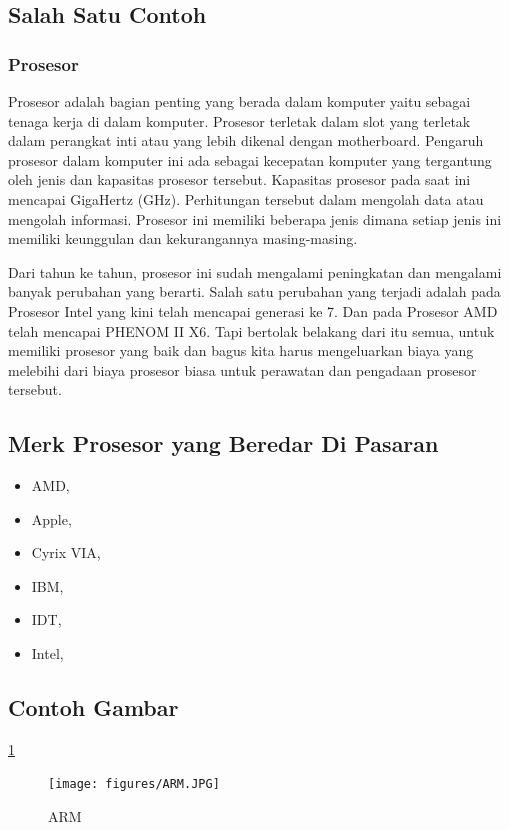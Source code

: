 \subsection{Salah Satu Contoh}

\subsubsection{Prosesor}
Prosesor adalah bagian penting yang berada dalam komputer yaitu sebagai tenaga kerja di dalam komputer. Prosesor terletak dalam slot
yang terletak dalam perangkat inti atau yang lebih dikenal dengan motherboard. Pengaruh prosesor dalam komputer ini ada sebagai kecepatan
komputer yang tergantung oleh jenis dan kapasitas prosesor tersebut. Kapasitas prosesor pada saat ini mencapai GigaHertz (GHz).
Perhitungan tersebut dalam mengolah data atau mengolah informasi. Prosesor ini memiliki beberapa jenis dimana setiap jenis ini memiliki 
keunggulan dan kekurangannya masing-masing.

Dari tahun ke tahun, prosesor ini sudah mengalami peningkatan dan mengalami banyak perubahan yang berarti. Salah satu perubahan yang 
terjadi adalah pada Prosesor Intel yang kini telah mencapai generasi ke 7. Dan pada Prosesor AMD telah mencapai PHENOM II X6. Tapi
bertolak belakang dari itu semua, untuk memiliki prosesor yang baik dan bagus kita harus mengeluarkan biaya yang melebihi dari biaya
prosesor biasa untuk perawatan dan pengadaan prosesor tersebut.

\subsection{Merk Prosesor yang Beredar Di Pasaran}
\begin{itemize}	
	\item AMD,
	\item Apple,
	\item Cyrix VIA,
	\item IBM,
	\item IDT,
	\item Intel,
\end{itemize}

\subsection{Contoh Gambar}

\ref{ARM}
\begin{figure}[ht]
\centerline{\texttt{[image: figures/ARM.JPG]}}
\caption{ARM}
\label{ARM}
\end{figure}

